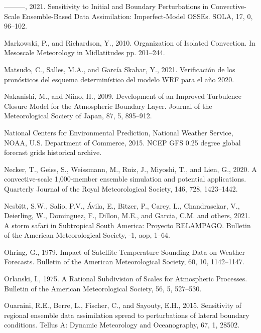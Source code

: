 \documentclass[12pt,oneside,a4paper]{reedthesis}
\begin{document}
\leavevmode\hypertarget{ref-maldonado2021}{}%
---------, 2021. Sensitivity to Initial and Boundary Perturbations in Convective-Scale Ensemble-Based Data Assimilation: Imperfect-Model OSSEs. SOLA, 17, 0, 96--102.

\leavevmode\hypertarget{ref-markowski2010}{}%
Markowski, P., and Richardson, Y., 2010. Organization of Isolated Convection. In Mesoscale Meteorology in Midlatitudes pp. 201--244.

\leavevmode\hypertarget{ref-matsudo2021}{}%
Matsudo, C., Salles, M.A., and García Skabar, Y., 2021. Verificación de los pronósticos del esquema determinístico del modelo WRF para el año 2020.

\leavevmode\hypertarget{ref-nakanishi2009}{}%
Nakanishi, M., and Niino, H., 2009. Development of an Improved Turbulence Closure Model for the Atmospheric Boundary Layer. Journal of the Meteorological Society of Japan, 87, 5, 895--912.

\leavevmode\hypertarget{ref-cisl_rda_ds084.1}{}%
National Centers for Environmental Prediction, National Weather Service, NOAA, U.S. Department of Commerce, 2015. NCEP GFS 0.25 degree global forecast grids historical archive.

\leavevmode\hypertarget{ref-necker2020}{}%
Necker, T., Geiss, S., Weissmann, M., Ruiz, J., Miyoshi, T., and Lien, G., 2020. A convective‐scale 1,000‐member ensemble simulation and potential applications. Quarterly Journal of the Royal Meteorological Society, 146, 728, 1423--1442.

\leavevmode\hypertarget{ref-nesbitt2021}{}%
Nesbitt, S.W., Salio, P.V., Ávila, E., Bitzer, P., Carey, L., Chandrasekar, V., Deierling, W., Dominguez, F., Dillon, M.E., and Garcia, C.M. and others, 2021. A storm safari in Subtropical South America: Proyecto RELAMPAGO. Bulletin of the American Meteorological Society, -1, aop, 1--64.

\leavevmode\hypertarget{ref-ohring1979}{}%
Ohring, G., 1979. Impact of Satellite Temperature Sounding Data on Weather Forecasts. Bulletin of the American Meteorological Society, 60, 10, 1142--1147.

\leavevmode\hypertarget{ref-orlanski1975}{}%
Orlanski, I., 1975. A Rational Subdivision of Scales for Atmospheric Processes. Bulletin of the American Meteorological Society, 56, 5, 527--530.

\leavevmode\hypertarget{ref-ouaraini2015}{}%
Ouaraini, R.E., Berre, L., Fischer, C., and Sayouty, E.H., 2015. Sensitivity of regional ensemble data assimilation spread to perturbations of lateral boundary conditions. Tellus A: Dynamic Meteorology and Oceanography, 67, 1, 28502.
\end{document}

